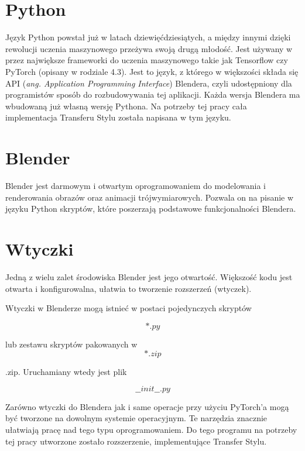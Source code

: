 \documentclass[brudnopis]{xmgr}
\begin{document}
\section{Python\label{s:dsssl}}

Język Python powstał już w latach dziewięćdziesiątych, a między innymi dzięki rewolucji uczenia maszynowego przeżywa swoją drugą młodość. Jest używany w przez największe frameworki do uczenia maszynowego takie jak Tensorflow czy PyTorch (opisany w rodziale  4.3).
Jest to język, z którego w większości składa się API (\textit{ang. Application Programming Interface}) Blendera, czyli udostępniony dla programistów sposób do rozbudowywania tej aplikacji. Każda wersja Blendera ma wbudowaną już własną wersję Pythona. Na potrzeby tej pracy cała implementacja Transferu Stylu została napisana w tym języku.

\section{Blender\label{s:dsssl}}

Blender jest darmowym i otwartym oprogramowaniem do modelowania i renderowania obrazów oraz animacji trójwymiarowych. Pozwala on na pisanie w języku Python skryptów, które poszerzają podstawowe funkcjonalności Blendera.

\section{Wtyczki\label{s:dsssl}}

Jedną z wielu zalet środowiska Blender jest jego otwartość. Większość kodu jest otwarta i konfigurowalna, ułatwia to tworzenie rozszerzeń (wtyczek).

Wtyczki w Blenderze mogą istnieć w postaci pojedynczych skryptów 

\begin{equation}
*.py
\end{equation}

lub zestawu skryptów pakowanych w 
\begin{equation}
*.zip
\end{equation}

.zip. Uruchamiany wtedy jest plik 

\begin{equation}
\_\_init\_\_.py
\end{equation}


Zarówno wtyczki do Blendera jak i same operacje przy użyciu PyTorch’a mogą być tworzone na dowolnym systemie operacyjnym. Te narzędzia znacznie ułatwiają pracę nad tego typu oprogramowaniem.
 Do tego programu na potrzeby tej pracy utworzone zostało rozszerzenie, implementujące Transfer Stylu. 
\end{document}
